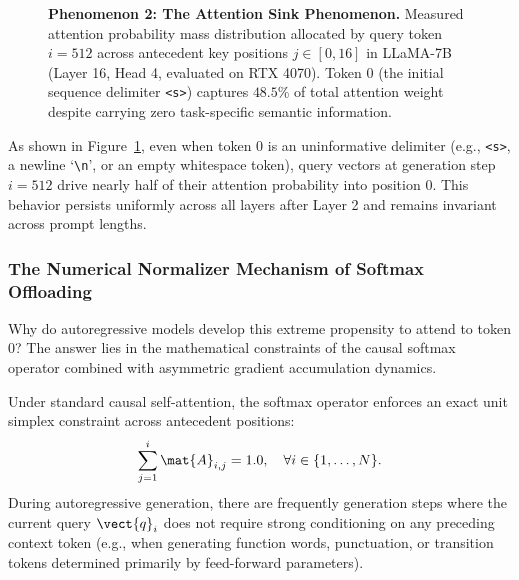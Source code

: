 \begin{figure}[t]
{
}
\caption[Phenomenon 2]{\textbf{Phenomenon 2: The Attention Sink Phenomenon.} Measured attention probability mass distribution allocated by query token $i=512$ across antecedent key positions $j \in [0, 16]$ in LLaMA-7B (Layer 16, Head 4, evaluated on RTX 4070). Token $0$ (the initial sequence delimiter \texttt{<s>}) captures $48.5\%$ of total attention weight despite carrying zero task-specific semantic information.}
\label{fig:phenom2_attention_sink_bars}
\end{figure}

As shown in Figure~\ref{fig:phenom2_attention_sink_bars}, even when token $0$ is an uninformative delimiter (e.g., \texttt{<s>}, a newline `\verb|\n|', or an empty whitespace token), query vectors at generation step $i = 512$ drive nearly half of their attention probability into position $0$. This behavior persists uniformly across all layers after Layer 2 and remains invariant across prompt lengths.

\subsubsection{The Numerical Normalizer Mechanism of Softmax Offloading}
\label{sec:phenom_sink_normalizer}

Why do autoregressive models develop this extreme propensity to attend to token 0? The answer lies in the mathematical constraints of the causal softmax operator combined with asymmetric gradient accumulation dynamics.

Under standard causal self-attention, the softmax operator enforces an exact unit simplex constraint across antecedent positions:
\begin{equation}
\sum_{j=1}^{i} \mat{A}_{i, j} = 1.0, \quad \forall i \in \{1, \dots, N\}.
\end{equation}
During autoregressive generation, there are frequently generation steps where the current query $\vect{q}_i$ does not require strong conditioning on any preceding context token (e.g., when generating function words, punctuation, or transition tokens determined primarily by feed-forward parameters). 

